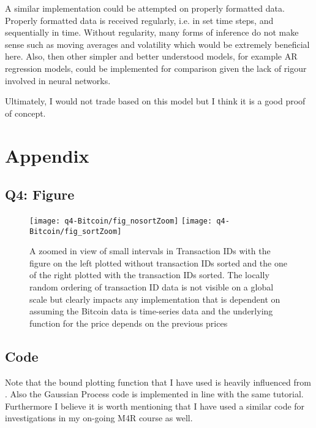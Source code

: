 \documentclass{article}
\begin{document}
A similar implementation could be attempted on properly formatted data. Properly formatted data is received regularly, i.e. in set time steps, and sequentially in time. Without regularity, many forms of inference do not make sense such as moving averages and volatility which would be extremely beneficial here. Also, then other simpler and better understood models, for example AR regression models, could be implemented for comparison given the lack of rigour involved in neural networks.

Ultimately, I would not trade based on this model but I think it is a good proof of concept.

\newpage
\section*{Appendix}

\subsection{Q4: Figure}

\begin{figure}[h!]
		\centering
		\texttt{[image: q4-Bitcoin/fig\_nosortZoom]}
		\texttt{[image: q4-Bitcoin/fig\_sortZoom]}
		\caption{A zoomed in view of small intervals in Transaction IDs with the figure on the left plotted without transaction IDs sorted and the one of the right plotted with the transaction IDs sorted. The locally random ordering of transaction ID data is not visible on a global scale but clearly impacts any implementation that is dependent on assuming the Bitcoin data is time-series data and the underlying function for the price depends on the previous prices}
\end{figure}

\subsection{Code}

Note that the bound plotting function that I have used is heavily influenced from \cite{ebden2015gp}. Also the Gaussian Process code is implemented in line with the same tutorial. Furthermore I believe it is worth mentioning that I have used a similar code for investigations in my on-going M4R course as well.
\end{document}
